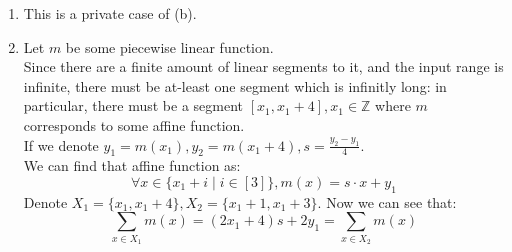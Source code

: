 \begin{enumerate}[label=(\alph*)]
    \item This is a private case of (b).
    \item Let $m$ be some piecewise linear function.\\
        Since there are a finite amount of linear segments to it,
        and the input range is infinite, there must be at-least
        one segment which is infinitly long: in particular,
        there must be a segment $[x_1,x_1+4], x_1\in\mathbb{Z}$
        where $m$ corresponds to some affine function.\\
        If we denote $y_1=m(x_1), y_2=m(x_1+4), s = \frac{y_2-y_1}{4}$.\\
        We can find that affine function as:
        \[
            \forall x\in \{x_1+i\mid i\in[3]\}, m(x)=s\cdot x+y_1
        \]
        Denote $X_1=\{x_1,x_1+4\}, X_2=\{x_1+1,x_1+3\}$.
        Now we can see that:
        \[
            \sum_{x\in X_1}m(x)=
            (2x_1+4)s+2y_1=
            \sum_{x\in X_2}m(x)
        \]
\end{enumerate}
